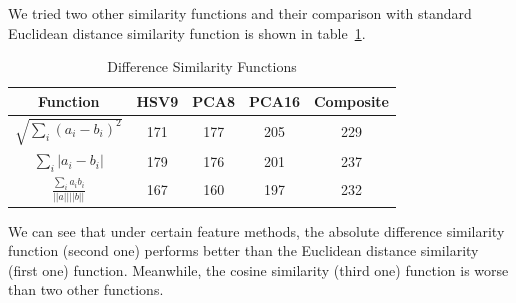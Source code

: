\documentclass{acm_proc_article-sp}
\begin{document}
We tried two other similarity functions and their comparison
    with standard Euclidean distance similarity function is shown
    in table~\ref{table:simfunc}.
\begin{table} \centering 
\begin{tabular}{|c|c|c|c|c|}
    \hline
    Function & HSV9 & PCA8 & PCA16 & Composite \\ \hline
    $\sqrt{\sum_i (a_i - b_i)^2}$ & 171 & 177 & 205 & 229 \\ \hline
    $\sum_i |a_i - b_i|$ & 179 & 176 & 201 & 237 \\ \hline
    $\frac{\sum_i a_i b_i}{||a|| ||b||}$
    & 167 & 160 & 197 & 232 \\ \hline
\end{tabular} 
\caption{Difference Similarity Functions}
\label{table:simfunc}
\end{table}
We can see that under certain feature methods,
    the absolute difference similarity function (second one) performs better
    than the Euclidean distance similarity (first one) function.
Meanwhile, the cosine similarity (third one) function
    is worse than two other functions.

\nocite{*}

 

\balancecolumns
\end{document}
